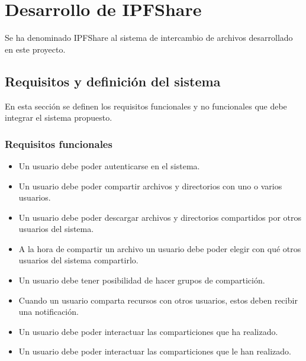\chapter{Desarrollo de IPFShare}\label{chap:4desarrollo}
Se ha denominado IPFShare al sistema de intercambio de archivos desarrollado en este proyecto.
\section{Requisitos y definición del sistema}
En esta sección se definen los requisitos funcionales y no funcionales que debe integrar el sistema propuesto.
\subsection{Requisitos funcionales}
\begin{itemize}[noitemsep,after=\vspace{-0.6\baselineskip}]
  \item Un usuario debe poder autenticarse en el sistema.
  \item Un usuario debe poder compartir archivos y directorios con uno o varios usuarios.
  \item Un usuario debe poder descargar archivos y directorios compartidos por otros usuarios del sistema.
  \item A la hora de compartir un archivo un usuario debe poder elegir con qué otros usuarios del sistema compartirlo.
  \item Un usuario debe tener posibilidad de hacer grupos de compartición.
  \item Cuando un usuario comparta recursos con otros usuarios, estos deben recibir una notificación.
  \item Un usuario debe poder interactuar las comparticiones que ha realizado.
  \item Un usuario debe poder interactuar las comparticiones que le han realizado.
\end{itemize}
